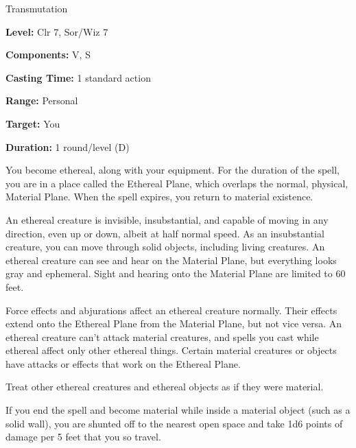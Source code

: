 
Transmutation

\textbf{Level:} Clr 7, Sor/Wiz 7

\textbf{Components:} V, S

\textbf{Casting Time:} 1 standard action

\textbf{Range:} Personal

\textbf{Target:} You

\textbf{Duration:} 1 round/level (D)

You become ethereal, along with your equipment. For the duration of the spell, 
you are in a place called the Ethereal Plane, which overlaps the normal, physical, 
Material Plane. When the spell expires, you return to material existence.

An ethereal creature is invisible, insubstantial, and capable of moving in any 
direction, even up or down, albeit at half normal speed. As an insubstantial creature, 
you can move through solid objects, including living creatures. An ethereal creature 
can see and hear on the Material Plane, but everything looks gray and ephemeral. 
Sight and hearing onto the Material Plane are limited to 60 feet.

Force effects and abjurations affect an ethereal creature normally. Their effects 
extend onto the Ethereal Plane from the Material Plane, but not vice versa. An 
ethereal creature can't attack material creatures, and spells you cast while ethereal 
affect only other ethereal things. Certain material creatures or objects have attacks 
or effects that work on the Ethereal Plane.

Treat other ethereal creatures and ethereal objects as if they were material. 

If you end the spell and become material while inside a material object (such as 
a solid wall), you are shunted off to the nearest open space and take 1d6 points 
of damage per 5 feet that you so travel.

